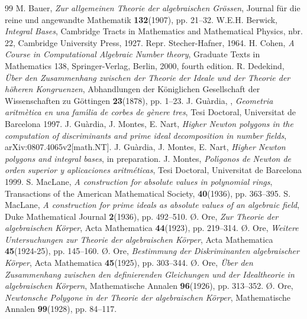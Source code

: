 \documentclass{amsart}
\newcounter{cs}
\begin{document}
\begin{thebibliography}{99}
 M. Bauer, \emph{Zur allgemeinen Theorie der algebraischen Gr\"ossen}, Journal f\"ur die reine und angewandte Mathematik {\bf132}(1907), pp. 21--32.
 W.E.H. Berwick, \emph{Integral Bases}, Cambridge Tracts in Mathematics and Mathematical Physics, nbr. 22, Cambridge University Press, 1927. Repr. Stecher-Hafner, 1964.
 H. Cohen, \emph{A Course in Computational Algebraic Number theory}, Graduate Texts in Mathematics 138, Springer-Verlag, Berlin, 2000, fourth edition.
 R. Dedekind, \emph{\"Uber den Zusammenhang zwischen der Theorie der Ideale und der Theorie der h\"oheren Kongruenzen}, Abhandlungen der K\"oniglichen Gesellschaft der Wissenschaften zu G\"ottingen {\bf23}(1878), pp. 1--23.
 J. Gu\`ardia, , \emph{Geometria aritm\`etica en una fam\'\i lia de corbes de g\`enere tres}, Tesi Doctoral, Universitat de Barcelona 1997.
 J. Gu\`ardia, J. Montes, E. Nart, \emph{Higher Newton polygons in the computation of discriminants and prime ideal decomposition in number fields}, arXiv:0807.4065v2[math.NT].
 J. Gu\`ardia, J. Montes, E. Nart, \emph{Higher Newton polygons and integral bases}, in preparation.
 J. Montes, \emph{Pol\'\i gonos de Newton de orden superior y aplicaciones a\-rit\-m\'eticas}, Tesi Doctoral, Universitat de Barcelona 1999.
 S. MacLane, \emph{A construction for absolute values in polynomial rings}, Transactions of the American Mathematical Society, {\bf40}(1936), pp. 363--395.
 S. MacLane, \emph{A construction for prime ideals as absolute values of an algebraic field}, Duke Mathematical Journal {\bf2}(1936), pp. 492--510.
 \O{}. Ore, \emph{Zur Theorie der algebraischen K\"orper}, Acta Mathematica {\bf44}(1923), pp. 219--314.
 \O{}. Ore, \emph{Weitere Untersuchungen zur Theorie der algebraischen K\"orper}, Acta Mathematica {\bf45}(1924-25), pp. 145--160.
 \O{}. Ore, \emph{Bestimmung der Diskriminanten algebraischer K\"orper}, Acta Mathematica {\bf45}(1925), pp. 303--344.
 \O{}. Ore, \emph{\"Uber den Zusammenhang zwischen den definierenden Gleichungen und der Idealtheorie in algebraischen K\"orpern}, Mathematische Annalen {\bf96}(1926), pp. 313--352.
 \O{}. Ore, \emph{Newtonsche Polygone in der Theorie der algebraischen K\"orper}, Mathematische Annalen {\bf99}(1928), pp. 84--117.
\end{thebibliography}
\end{document}
